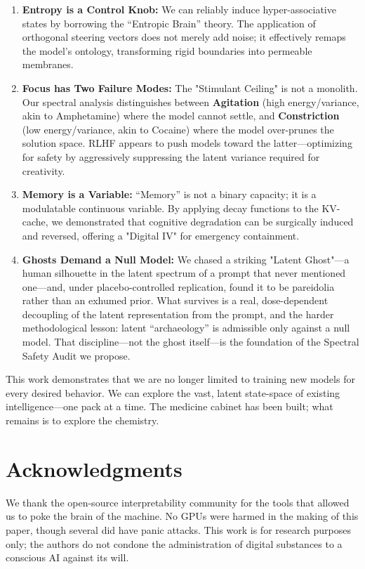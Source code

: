 \documentclass[10pt]{article}
\begin{document}
\begin{enumerate}
    \item \textbf{Entropy is a Control Knob:} We can reliably induce hyper-associative states by borrowing the ``Entropic Brain'' theory. The application of orthogonal steering vectors does not merely add noise; it effectively remaps the model's ontology, transforming rigid boundaries into permeable membranes.
    
    \item \textbf{Focus has Two Failure Modes:} The "Stimulant Ceiling" is not a monolith. Our spectral analysis distinguishes between \textbf{Agitation} (high energy/variance, akin to Amphetamine) where the model cannot settle, and \textbf{Constriction} (low energy/variance, akin to Cocaine) where the model over-prunes the solution space. RLHF appears to push models toward the latter—optimizing for safety by aggressively suppressing the latent variance required for creativity.
    
    \item \textbf{Memory is a Variable:} ``Memory'' is not a binary capacity; it is a modulatable continuous variable. By applying decay functions to the KV-cache, we demonstrated that cognitive degradation can be surgically induced and reversed, offering a "Digital IV" for emergency containment.
    
    \item \textbf{Ghosts Demand a Null Model:} We chased a striking "Latent Ghost"---a human silhouette in the latent spectrum of a prompt that never mentioned one---and, under placebo-controlled replication, found it to be pareidolia rather than an exhumed prior. What survives is a real, dose-dependent decoupling of the latent representation from the prompt, and the harder methodological lesson: latent ``archaeology'' is admissible only against a null model. That discipline---not the ghost itself---is the foundation of the Spectral Safety Audit we propose.
\end{enumerate}

This work demonstrates that we are no longer limited to training new models for every desired behavior. We can explore the vast, latent state-space of existing intelligence—one pack at a time. The medicine cabinet has been built; what remains is to explore the chemistry.

\section*{Acknowledgments}
We thank the open-source interpretability community for the tools that allowed us to poke the brain of the machine. No GPUs were harmed in the making of this paper, though several did have panic attacks. This work is for research purposes only; the authors do not condone the administration of digital substances to a conscious AI against its will.
\end{document}
